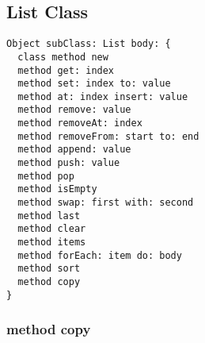 \subsection{List Class}

\begin{lstlisting}
Object subClass: List body: {
  class method new
  method get: index
  method set: index to: value
  method at: index insert: value
  method remove: value
  method removeAt: index
  method removeFrom: start to: end
  method append: value
  method push: value
  method pop
  method isEmpty
  method swap: first with: second
  method last
  method clear
  method items
  method forEach: item do: body
  method sort
  method copy
}
\end{lstlisting}

\subsubsection{method copy}

